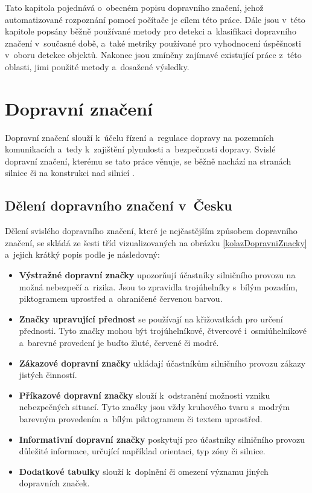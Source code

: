 Tato kapitola pojednává o~obecném popisu dopravního značení, jehož automatizované rozpoznání pomocí počítače je cílem této práce. Dále jsou v~této kapitole popsány běžně používané metody pro detekci a~klasifikaci dopravního značení v~současné době, a~také metriky používané pro vyhodnocení úspěšnosti v~oboru detekce objektů. Nakonec jsou zmíněny zajímavé existující práce z~této oblasti, jimi použité metody a~dosažené výsledky.




\section{Dopravní značení}
\label{dopravniZnaceni}
Dopravní značení slouží k~účelu řízení a~regulace dopravy na pozemních komunikacích a~tedy k~zajištění plynulosti a~bezpečnosti dopravy. Svislé dopravní značení, kterému se tato práce věnuje, se běžně nachází na stranách silnice či na konstrukci nad silnicí \cite{dopravniZnacka, dopravniZnaceniVCesku}.

\subsection*{Dělení dopravního značení v~Česku}
\label{dopravniZnaceniDeleni}
Dělení svislého dopravního značení, které je nejčastějším způsobem dopravního značení, se skládá ze šesti tříd vizualizovaných na obrázku \ref{kolazDopravniZnacky} a~jejich krátký popis podle \cite{seznamDopravnichZnacek, dopravniZnacka, dopravniZnaceniVCesku} je následovný:

\begin{itemize}
    \item \textbf{Výstražné dopravní značky} upozorňují účastníky silničního provozu na možná nebezpečí a~rizika. Jsou to zpravidla trojúhelníky s~bílým pozadím, piktogramem uprostřed a~ohraničené červenou barvou.
    \item \textbf{Značky upravující přednost} se používají na křižovatkách pro určení přednosti. Tyto značky mohou být trojúhelníkové, čtvercové i~osmiúhelníkové a~barevné provedení je buďto žluté, červené či modré.
    \item \textbf{Zákazové dopravní značky} ukládají účastníkům silničního provozu zákazy jistých činností.
    \item \textbf{Příkazové dopravní značky} slouží k~odstranění možnosti vzniku nebezpečných situací. Tyto značky jsou vždy kruhového tvaru s~modrým barevným provedením a~bílým piktogramem či textem uprostřed.
    \item \textbf{Informativní dopravní značky} poskytují pro účastníky silničního provozu důležité informace, určující například orientaci, typ zóny či silnice.
    \item \textbf{Dodatkové tabulky} slouží k~doplnění či omezení významu jiných dopravních značek. 
\end{itemize}

